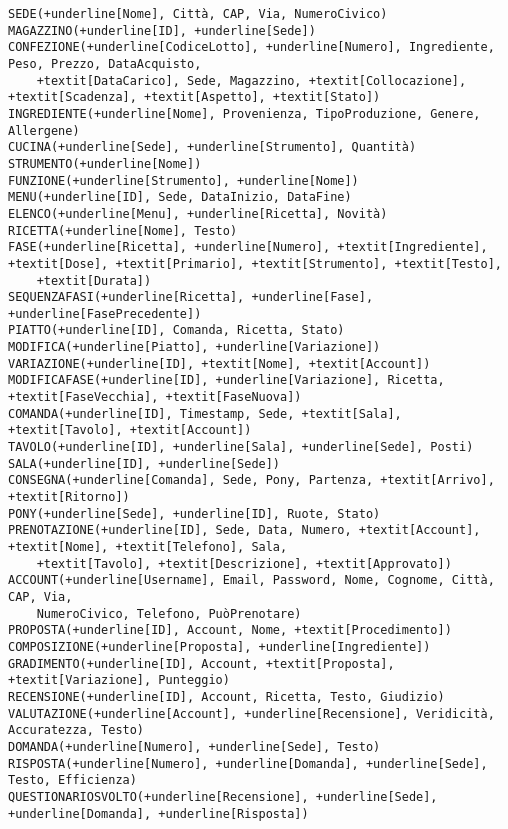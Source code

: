 \begin{Verbatim}[commandchars=+\[\]]
SEDE(+underline[Nome], Città, CAP, Via, NumeroCivico)
MAGAZZINO(+underline[ID], +underline[Sede])
CONFEZIONE(+underline[CodiceLotto], +underline[Numero], Ingrediente, Peso, Prezzo, DataAcquisto,
    +textit[DataCarico], Sede, Magazzino, +textit[Collocazione], +textit[Scadenza], +textit[Aspetto], +textit[Stato])
INGREDIENTE(+underline[Nome], Provenienza, TipoProduzione, Genere, Allergene)
CUCINA(+underline[Sede], +underline[Strumento], Quantità)
STRUMENTO(+underline[Nome])
FUNZIONE(+underline[Strumento], +underline[Nome])
MENU(+underline[ID], Sede, DataInizio, DataFine)
ELENCO(+underline[Menu], +underline[Ricetta], Novità)
RICETTA(+underline[Nome], Testo)
FASE(+underline[Ricetta], +underline[Numero], +textit[Ingrediente], +textit[Dose], +textit[Primario], +textit[Strumento], +textit[Testo],
    +textit[Durata])
SEQUENZAFASI(+underline[Ricetta], +underline[Fase], +underline[FasePrecedente])
PIATTO(+underline[ID], Comanda, Ricetta, Stato)
MODIFICA(+underline[Piatto], +underline[Variazione])
VARIAZIONE(+underline[ID], +textit[Nome], +textit[Account])
MODIFICAFASE(+underline[ID], +underline[Variazione], Ricetta, +textit[FaseVecchia], +textit[FaseNuova])
COMANDA(+underline[ID], Timestamp, Sede, +textit[Sala], +textit[Tavolo], +textit[Account])
TAVOLO(+underline[ID], +underline[Sala], +underline[Sede], Posti)
SALA(+underline[ID], +underline[Sede])
CONSEGNA(+underline[Comanda], Sede, Pony, Partenza, +textit[Arrivo], +textit[Ritorno])
PONY(+underline[Sede], +underline[ID], Ruote, Stato)
PRENOTAZIONE(+underline[ID], Sede, Data, Numero, +textit[Account], +textit[Nome], +textit[Telefono], Sala,
    +textit[Tavolo], +textit[Descrizione], +textit[Approvato])
ACCOUNT(+underline[Username], Email, Password, Nome, Cognome, Città, CAP, Via,
    NumeroCivico, Telefono, PuòPrenotare)
PROPOSTA(+underline[ID], Account, Nome, +textit[Procedimento])
COMPOSIZIONE(+underline[Proposta], +underline[Ingrediente])
GRADIMENTO(+underline[ID], Account, +textit[Proposta], +textit[Variazione], Punteggio)
RECENSIONE(+underline[ID], Account, Ricetta, Testo, Giudizio)
VALUTAZIONE(+underline[Account], +underline[Recensione], Veridicità, Accuratezza, Testo)
DOMANDA(+underline[Numero], +underline[Sede], Testo)
RISPOSTA(+underline[Numero], +underline[Domanda], +underline[Sede], Testo, Efficienza)
QUESTIONARIOSVOLTO(+underline[Recensione], +underline[Sede], +underline[Domanda], +underline[Risposta])
\end{Verbatim}
